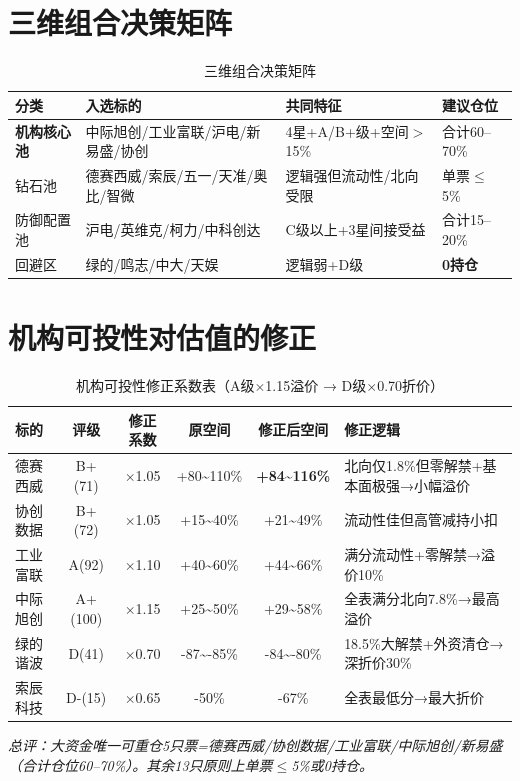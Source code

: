 \section{三维组合决策矩阵}

\begin{table}[H]
\centering\small
\renewcommand{\arraystretch}{1.3}
\begin{tabularx}{\textwidth}{l l X l}
\toprule
\textbf{分类} & \textbf{入选标的} & \textbf{共同特征} & \textbf{建议仓位} \\
\midrule
\textbf{机构核心池} & 中际旭创/工业富联/沪电/新易盛/协创 & 4星+A/B+级+空间$>$15\% & 合计60--70\% \\
钻石池 & 德赛西威/索辰/五一/天准/奥比/智微 & 逻辑强但流动性/北向受限 & 单票$\leq$5\% \\
防御配置池 & 沪电/英维克/柯力/中科创达 & C级以上+3星间接受益 & 合计15--20\% \\
\textcolor{riskred}{回避区} & 绿的/鸣志/中大/天娱 & 逻辑弱+D级 & \textbf{0持仓} \\
\bottomrule
\end{tabularx}
\caption{三维组合决策矩阵}
\end{table}

\section{机构可投性对估值的修正}

\begin{table}[H]
\centering\scriptsize
\renewcommand{\arraystretch}{1.15}
\begin{tabularx}{\textwidth}{l c c c c X}
\toprule
\textbf{标的} & \textbf{评级} & \textbf{修正系数} & \textbf{原空间} & \textbf{修正后空间} & \textbf{修正逻辑} \\
\midrule
德赛西威 & B+(71) & $\times$1.05 & +80\textasciitilde110\% & \textbf{+84\textasciitilde116\%} & 北向仅1.8\%但零解禁+基本面极强→小幅溢价 \\
协创数据 & B+(72) & $\times$1.05 & +15\textasciitilde40\% & +21\textasciitilde49\% & 流动性佳但高管减持小扣 \\
工业富联 & A(92) & $\times$1.10 & +40\textasciitilde60\% & +44\textasciitilde66\% & 满分流动性+零解禁→溢价10\% \\
中际旭创 & A+(100) & $\times$1.15 & +25\textasciitilde50\% & +29\textasciitilde58\% & 全表满分北向7.8\%→最高溢价 \\
绿的谐波 & D(41) & $\times$0.70 & -87\textasciitilde-85\% & \textcolor{riskred}{-84\textasciitilde-80\%} & 18.5\%大解禁+外资清仓→深折价30\% \\
索辰科技 & D-(15) & $\times$0.65 & -50\% & \textcolor{riskred}{-67\%} & 全表最低分→最大折价 \\
\bottomrule
\end{tabularx}
\caption{机构可投性修正系数表（A级$\times$1.15溢价 → D级$\times$0.70折价）}
\end{table}

\textit{总评：大资金唯一可重仓5只票=德赛西威/协创数据/工业富联/中际旭创/新易盛（合计仓位60--70\%）。其余13只原则上单票$\leq$5\%或0持仓。}
